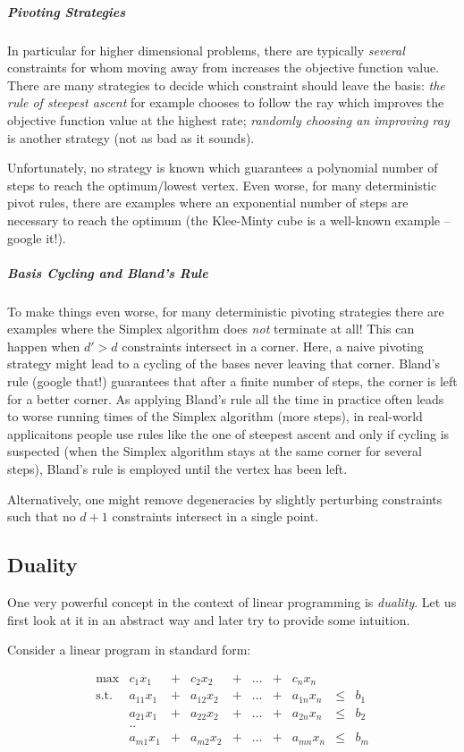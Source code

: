 \documentclass{article}
\begin{document}
\subparagraph*{Pivoting Strategies}
In particular for higher dimensional problems, there are typically \emph{several} constraints for whom moving away from increases the objective function value. There are many strategies to decide which constraint should leave the basis: \emph{the rule of steepest ascent} for example chooses to follow the ray which improves the objective function value at the highest rate; \emph{randomly choosing an improving ray} is another strategy (not as bad as it sounds).

Unfortunately, no strategy is known which guarantees a polynomial number of steps to reach the optimum/lowest vertex. Even worse, for many deterministic pivot rules, there are examples where an exponential number of steps are necessary to reach the optimum (the Klee-Minty cube is a well-known example -- google it!).

\subparagraph*{Basis Cycling and Bland's Rule}

To make things even worse, for many deterministic pivoting strategies there are examples where the Simplex algorithm does \emph{not} terminate at all! This can happen when $d'>d$ constraints intersect in a corner. Here, a naive pivoting strategy might lead to a cycling of the bases never leaving that corner. Bland's rule (google that!) guarantees that after a finite number of steps, the corner is left for a better corner. As applying Bland's rule all the time in practice often leads to worse running times of the Simplex algorithm (more steps), in real-world applicaitons people use rules like the one of steepest ascent and only if cycling is suspected (when the Simplex algorithm stays at the same corner for several steps), Bland's rule is employed until the vertex has been left.

Alternatively, one might remove degeneracies by slightly perturbing constraints such that no $d+1$ constraints intersect in a single point.

\subsection{Duality}
One very powerful concept in the context of linear programming is \emph{duality}. Let us first look at it in an abstract way and later try to provide some intuition.

Consider a linear program in standard form:

\[
\begin{matrix}
	\max	& c_1 x_1 &+& c_2 x_2 &+& \dots &+& c_n x_n&&\\  
	\mbox{s.t.}	& a_{11} x_1 &+& a_{12} x_2&+& \dots &+&a_{1n} x_n&\leq&b_1\\
			& a_{21} x_1 &+& a_{22} x_2&+& \dots &+&a_{2n} x_n&\leq&b_2\\
			& ..	&&&&&&&&\\
			& a_{m1} x_1 &+& a_{m2} x_2&+& \dots &+&a_{mn} x_n&\leq&b_m\\
\end{matrix}
\]
\end{document}
